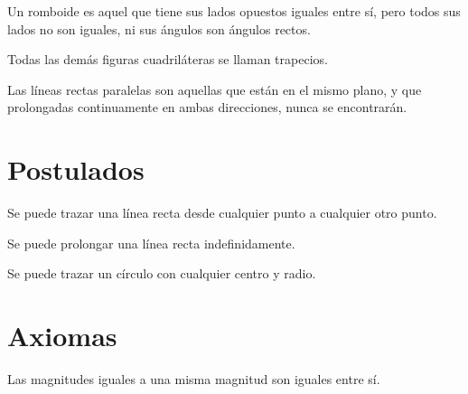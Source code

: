 \documentclass[booklanguage=english]{byrnebook}
\begin{document}
\startdefinition{}\label{def:I.XXXIII}
\begin{center}
\drawCurrentPictureInMargin[inside] Un romboide es aquel que tiene sus lados opuestos iguales entre sí, pero todos sus lados no son iguales, ni sus ángulos son ángulos rectos.
\end{center}

\startdefinition{}\label{def:I.XXXIV}
\begin{center}
Todas las demás figuras cuadriláteras se llaman trapecios.
\end{center}

\startdefinition{}\label{def:I.XXXV}
\begin{center}
\drawCurrentPictureInMargin[inside] Las líneas rectas paralelas son aquellas que están en el mismo plano, y que prolongadas continuamente en ambas direcciones, nunca se encontrarán.
\end{center}

\chapter*{Postulados}

\startpostulate{}\label{post:I.I}
Se puede trazar una línea recta desde cualquier punto a cualquier otro punto.

\startpostulate{}\label{post:I.II}
Se puede prolongar una línea recta indefinidamente.

\startpostulate{}\label{post:I.III}
Se puede trazar un círculo con cualquier centro y radio.

\chapter*{Axiomas}

\startaxiom{}\label{ax:I.I}
Las magnitudes iguales a una misma magnitud son iguales entre sí.
\end{document}
